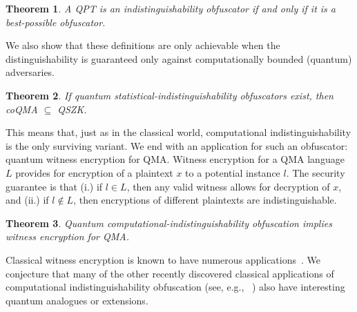 \documentclass[11pt]{amsart}
\numberwithin{equation}{section}
\newtheorem{theorem}{Theorem}
\begin{document}
\begin{theorem}
A QPT is an indistinguishability obfuscator if and only if it is a best-possible obfuscator.
\end{theorem}

\noindent We also show that these definitions are only achievable when the distinguishability is guaranteed only against computationally bounded (quantum) adversaries.

\begin{theorem}
If quantum statistical-indistinguishability obfuscators exist, then coQMA $\subseteq$ QSZK.
\end{theorem}

This means that, just as in the classical world, computational indistinguishability is the only surviving variant. We end with an application for such an obfuscator: quantum witness encryption for QMA. Witness encryption for a QMA language $L$ provides for encryption of a plaintext $x$ to a potential instance $l$. The security guarantee is that (i.) if $l \in L$, then any valid witness allows for decryption of $x$, and (ii.) if $l \notin L$, then encryptions of different plaintexts are indistinguishable. 

\begin{theorem}
Quantum computational-indistinguishability obfuscation implies witness encryption for QMA.
\end{theorem}

\noindent Classical witness encryption is known to have numerous applications~\cite{GGSW13}. We conjecture that many of the other recently discovered classical applications of computational indistinguishability obfuscation (see, e.g., ~\cite{SW14}) also have interesting quantum analogues or extensions.


\end{document}
